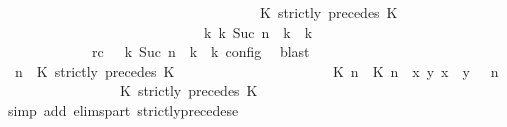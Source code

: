 \begin{isabellebody}
\ \ \ \ \ \ \ \ \ \ \ \ \ \ \ \ \ \ \ \ \ \ \ \ \ \ \ \ \ \ \ \ \ \ {\isasymturnstile}\ {\isasymPsi}\ {\isasymtriangleright}\ {\isacharparenleft}{\isacharparenleft}K\ strictly\ precedes\ K\ {\isacharhash}\ {\isasymPhi}{\isacharparenright}{\isacharparenright}\isanewline
\ \ \ \ \ \ \ \ \ \ \ \ \ \ \ \ \ \ \ \ \ \ \ \ \ \ \ \ \ {\isasymhookrightarrow}\isactrlbsup k\isactrlesup \ {\isacharparenleft}{\isasymGamma}\isactrlsub k{\isacharcomma}\ Suc\ n\ {\isasymturnstile}\ {\isasymPsi}\isactrlsub k\ {\isasymtriangleright}\ {\isasymPhi}\isactrlsub k{\isacharparenright}{\isacartoucheclose}\isanewline
\ \ \ \ \ \ \ \ \ \ \ \ \ rc{\isacharcolon}{\isacartoucheopen}{\isasymrho}\ {\isasymin}\ {\isasymlbrakk}\ {\isasymGamma}\isactrlsub k{\isacharcomma}\ Suc\ n\ {\isasymturnstile}\ {\isasymPsi}\isactrlsub k\ {\isasymtriangleright}\ {\isasymPhi}\isactrlsub k\ {\isasymrbrakk}\isactrlsub c\isactrlsub o\isactrlsub n\isactrlsub f\isactrlsub i\isactrlsub g{\isacartoucheclose}\ \isamarkupfalse%
\ blast\isanewline
\ \ \ \ \ \ \ \ \isamarkupfalse%
\ {\isacartoucheopen}{\isacharparenleft}{\isasymGamma}{\isacharcomma}\ n\ {\isasymturnstile}\ {\isacharparenleft}{\isacharparenleft}K\ strictly\ precedes\ K\ {\isacharhash}\ {\isasymPsi}{\isacharparenright}\ {\isasymtriangleright}\ {\isasymPhi}{\isacharparenright}\isanewline
\ \ \ \ \ \ \ \ \ \ \ \ \ \ \ \ {\isasymhookrightarrow}\ {\isacharparenleft}{\isacharparenleft}{\isacharparenleft}{\isasymlceil}{\isacharhash}\isactrlsup {\isasymle}\ K\ n{\isacharcomma}\ {\isacharhash}\isactrlsup {\isacharless}\ K\ n{\isasymrceil}\ {\isasymin}\ {\isacharparenleft}{\isasymlambda}{\isacharparenleft}x{\isacharcomma}\ y{\isacharparenright}{\isachardot}\ x\ {\isasymle}\ y{\isacharparenright}{\isacharparenright}\ {\isacharhash}\ {\isasymGamma}{\isacharparenright}{\isacharcomma}\ n\isanewline
\ \ \ \ \ \ \ \ \ \ \ \ \ \ {\isasymturnstile}\ {\isasymPsi}\ {\isasymtriangleright}\ {\isacharparenleft}{\isacharparenleft}K\ strictly\ precedes\ K\ {\isacharhash}\ {\isasymPhi}{\isacharparenright}{\isacharparenright}{\isacartoucheclose}\ \isamarkupfalse%
\ {\isacharparenleft}simp\ add{\isacharcolon}\ elims{\isacharunderscore}part\ strictly{\isacharunderscore}precedes{\isacharunderscore}e{\isacharparenright}\isanewline
\ \ \ \ \ \ \ \ \isamarkupfalse%

\end{isabellebody}
